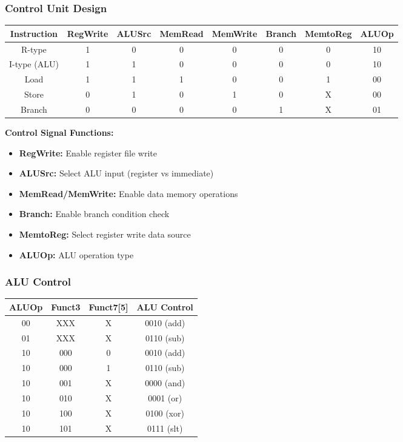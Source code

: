 \documentclass[aspectratio=169,xcolor=dvipsnames]{beamer}
\begin{document}
\begin{frame}
\frametitle{Control Unit Design}
\begin{center}
\scriptsize
\begin{tabular}{|c|c|c|c|c|c|c|c|}
\hline
\textbf{Instruction} & \textbf{RegWrite} & \textbf{ALUSrc} & \textbf{MemRead} & \textbf{MemWrite} & \textbf{Branch} & \textbf{MemtoReg} & \textbf{ALUOp} \\
\hline
R-type & 1 & 0 & 0 & 0 & 0 & 0 & 10 \\
I-type (ALU) & 1 & 1 & 0 & 0 & 0 & 0 & 10 \\
Load & 1 & 1 & 1 & 0 & 0 & 1 & 00 \\
Store & 0 & 1 & 0 & 1 & 0 & X & 00 \\
Branch & 0 & 0 & 0 & 0 & 1 & X & 01 \\
\hline
\end{tabular}
\end{center}

\vspace{1em}
\textbf{Control Signal Functions:}
\begin{itemize}
    \item \textbf{RegWrite:} Enable register file write
    \item \textbf{ALUSrc:} Select ALU input (register vs immediate)
    \item \textbf{MemRead/MemWrite:} Enable data memory operations
    \item \textbf{Branch:} Enable branch condition check
    \item \textbf{MemtoReg:} Select register write data source
    \item \textbf{ALUOp:} ALU operation type
\end{itemize}
\end{frame}

\begin{frame}
\frametitle{ALU Control}
\begin{center}
\begin{tabular}{|c|c|c|c|}
\hline
\textbf{ALUOp} & \textbf{Funct3} & \textbf{Funct7[5]} & \textbf{ALU Control} \\
\hline
00 & XXX & X & 0010 (add) \\
01 & XXX & X & 0110 (sub) \\
10 & 000 & 0 & 0010 (add) \\
10 & 000 & 1 & 0110 (sub) \\
10 & 001 & X & 0000 (and) \\
10 & 010 & X & 0001 (or) \\
10 & 100 & X & 0100 (xor) \\
10 & 101 & X & 0111 (slt) \\
\hline
\end{tabular}
\end{center}

\end{frame}
\end{document}
